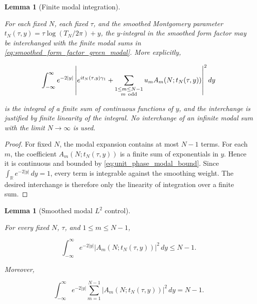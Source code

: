 \documentclass[11pt]{amsart}
\numberwithin{equation}{section}
\theoremstyle{plain}
\newtheorem{lemma}[theorem]{Lemma}
\theoremstyle{definition}
\theoremstyle{remark}
\begin{document}
\begin{lemma}[Finite modal integration]
\label{lem:finite_modal_integration}

For each fixed \(N\), each fixed \(\tau\), and the smoothed Montgomery
parameter \(t_N(\tau,y)=\tau\log(T_N/2\pi)+y\), the \(y\)-integral in the
smoothed form factor may be interchanged with the finite modal sums in
\eqref{eq:smoothed_form_factor_green_modal}. More explicitly,

\begin{equation}
\int_{-\infty}^{\infty}
e^{-2|y|}
\left|
e^{it_N(\tau,y)\gamma_1}
+
\sum_{\substack{1\le m\le N-1\\ m\ {\rm odd}}}
u_mA_m(N;t_N(\tau,y))
\right|^2dy
\end{equation}

is the integral of a finite sum of continuous functions of \(y\), and
the interchange is justified by finite linearity of the integral. No
interchange of an infinite modal sum with the limit \(N\to\infty\) is
used.

\end{lemma}

\begin{proof}
For fixed \(N\), the modal expansion contains at most \(N-1\) terms. For
each \(m\), the coefficient \(A_m(N;t_N(\tau,y))\) is a finite sum of
exponentials in \(y\). Hence it is continuous and bounded by
\eqref{eq:unit_phase_modal_bound}. Since
\(\int_{\mathbb R}e^{-2|y|}\,dy=1\), every term is integrable against the
smoothing weight. The desired interchange is therefore only the
linearity of integration over a finite sum.
\end{proof}

\begin{lemma}[Smoothed modal \(L^2\) control]
\label{lem:smoothed_modal_L2_control}

For every fixed \(N\), \(\tau\), and \(1\le m\le N-1\),

\begin{equation}
\int_{-\infty}^{\infty}
e^{-2|y|}
|A_m(N;t_N(\tau,y))|^2\,dy
\le
N-1.
\label{eq:single_mode_smoothed_L2_control}
\end{equation}

Moreover,

\begin{equation}
\int_{-\infty}^{\infty}
e^{-2|y|}
\sum_{m=1}^{N-1}|A_m(N;t_N(\tau,y))|^2\,dy
=
N-1.
\label{eq:all_modes_smoothed_L2_control}
\end{equation}

\end{lemma}
\end{document}

